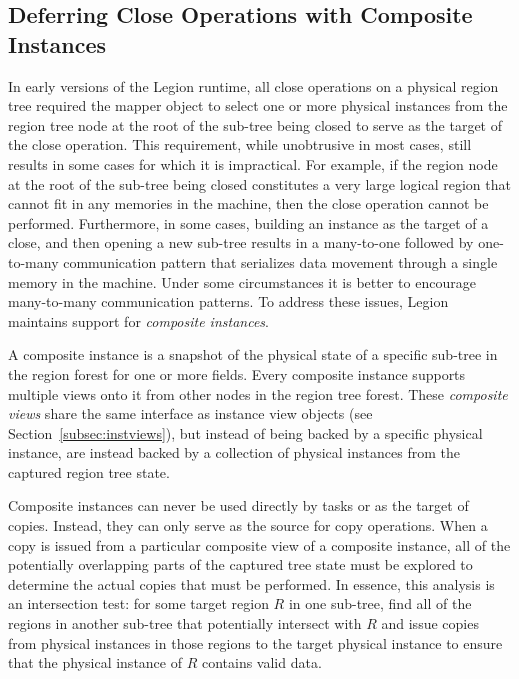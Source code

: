 \subsection{Deferring Close Operations with Composite Instances}
\label{subsec:composite}
In early versions of the Legion runtime, all close
operations on a physical region tree required the mapper 
object to select one or more physical instances from the
region tree node at the root of the sub-tree being 
closed to serve as the target of the close operation.
This requirement, while unobtrusive in most cases, still
results in some cases for which it is impractical. For example,
if the region node at the root of the sub-tree being closed
constitutes a very large logical region that cannot fit in
any memories in the machine, then the close operation cannot
be performed. Furthermore, in some cases, building an instance
as the target of a close, and then opening a new sub-tree
results in a many-to-one followed by one-to-many communication
pattern that serializes data movement through a single memory
in the machine. Under some circumstances it is better to 
encourage many-to-many communication patterns.  To address 
these issues, Legion maintains support for 
{\em composite instances}.

A composite instance is a snapshot of the physical state
of a specific sub-tree in the region forest for one or 
more fields. Every composite instance supports multiple
views onto it from other nodes in the region tree forest.
These {\em composite views} share the same interface as
instance view objects (see Section~\ref{subsec:instviews}),
but instead of being backed by a specific physical instance,
are instead backed by a collection of physical instances
from the captured region tree state.

Composite instances can never be used directly by tasks
or as the target of copies.  Instead, they can only
serve as the source for copy operations.  When a copy
is issued from a particular composite view of a composite
instance, all of the potentially overlapping parts of the 
captured tree state must be explored to determine the
actual copies that must be performed. In essence, this
analysis is an intersection test: for some target region 
$R$ in one sub-tree, find all of the regions in another 
sub-tree that potentially intersect with $R$ and issue
copies from physical instances in those regions to the
target physical instance to ensure that the physical
instance of $R$ contains valid data. 

